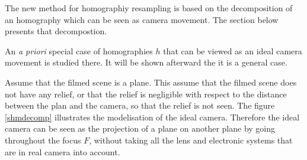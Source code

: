 The new method for homographiy resampling is based on the decomposition of an homography which can be seen as camera movement. The section below presents that decompostion.



\label{mouv_de_camera}

An \emph{a priori} special case of homographies $h$ that can be viewed as an ideal camera movement is studied there. It will be shown afterward the it is a general case.

Assume that the filmed scene is a plane. This assume that the filmed scene does not have any relief, or that the relief is negligible with respect to the distance between the plan and the camera, so that the relief is not seen. The figure \ref{shmdecomp} illustrates the modelisation of the ideal camera. Therefore the ideal camera can be seen as the projection of a plane on another plane by going throughout the focus $F$, without taking all the lens and electronic systems that are in real camera into account.



